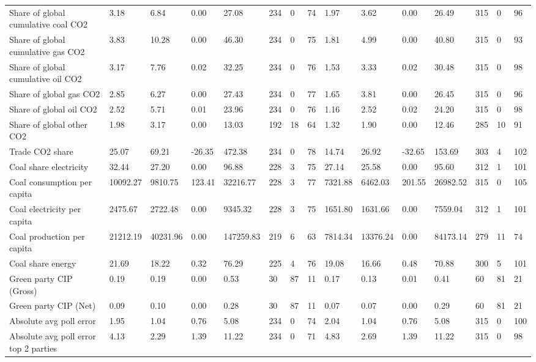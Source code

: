 \begin{longtable}{lllllllllllllll}
Share of global cumulative coal CO2 & 3.18 & 6.84 & 0.00 & 27.08 & 234 & 0 & 74 & 1.97 & 3.62 & 0.00 & 26.49 & 315 & 0 & 96\\
Share of global cumulative gas CO2 & 3.83 & 10.28 & 0.00 & 46.30 & 234 & 0 & 75 & 1.81 & 4.99 & 0.00 & 40.80 & 315 & 0 & 93\\
\addlinespace
Share of global cumulative oil CO2 & 3.17 & 7.76 & 0.02 & 32.25 & 234 & 0 & 76 & 1.53 & 3.33 & 0.02 & 30.48 & 315 & 0 & 98\\
Share of global gas CO2 & 2.85 & 6.27 & 0.00 & 27.43 & 234 & 0 & 77 & 1.65 & 3.81 & 0.00 & 26.45 & 315 & 0 & 96\\
Share of global oil CO2 & 2.52 & 5.71 & 0.01 & 23.96 & 234 & 0 & 76 & 1.16 & 2.52 & 0.02 & 24.20 & 315 & 0 & 98\\
Share of global other CO2 & 1.98 & 3.17 & 0.00 & 13.03 & 192 & 18 & 64 & 1.32 & 1.90 & 0.00 & 12.46 & 285 & 10 & 91\\
Trade CO2 share & 25.07 & 69.21 & -26.35 & 472.38 & 234 & 0 & 78 & 14.74 & 26.92 & -32.65 & 153.69 & 303 & 4 & 102\\
\addlinespace
Coal share electricity & 32.44 & 27.20 & 0.00 & 96.88 & 228 & 3 & 75 & 27.14 & 25.58 & 0.00 & 95.60 & 312 & 1 & 101\\
Coal consumption per capita & 10092.27 & 9810.75 & 123.41 & 32216.77 & 228 & 3 & 77 & 7321.88 & 6462.03 & 201.55 & 26982.52 & 315 & 0 & 105\\
Coal electricity per capita & 2475.67 & 2722.48 & 0.00 & 9345.32 & 228 & 3 & 75 & 1651.80 & 1631.66 & 0.00 & 7559.04 & 312 & 1 & 101\\
Coal production per capita & 21212.19 & 40231.96 & 0.00 & 147259.83 & 219 & 6 & 63 & 7814.34 & 13376.24 & 0.00 & 84173.14 & 279 & 11 & 74\\
Coal share energy & 21.69 & 18.22 & 0.32 & 76.29 & 225 & 4 & 76 & 19.08 & 16.66 & 0.48 & 70.88 & 300 & 5 & 101\\
\addlinespace
Green party CIP (Gross) & 0.19 & 0.19 & 0.00 & 0.53 & 30 & 87 & 11 & 0.17 & 0.13 & 0.01 & 0.41 & 60 & 81 & 21\\
Green party CIP (Net) & 0.09 & 0.10 & 0.00 & 0.28 & 30 & 87 & 11 & 0.07 & 0.07 & 0.00 & 0.29 & 60 & 81 & 21\\
Absolute avg poll error & 1.95 & 1.04 & 0.76 & 5.08 & 234 & 0 & 74 & 2.04 & 1.04 & 0.76 & 5.08 & 315 & 0 & 100\\
Absolute avg poll error top 2 parties & 4.13 & 2.29 & 1.39 & 11.22 & 234 & 0 & 71 & 4.83 & 2.69 & 1.39 & 11.22 & 315 & 0 & 98\\

\end{longtable}
